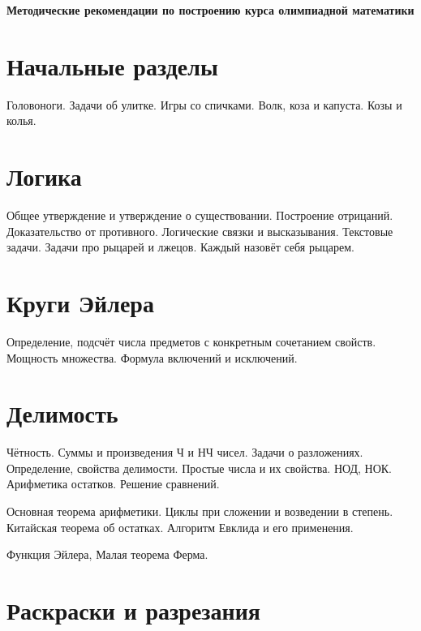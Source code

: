 \documentclass[a4paper,11pt,landscape]{article}
\begin{document}
 \thispagestyle{empty}

\begin{center}
    \Large \textbf{Методические рекомендации по построению курса олимпиадной математики}
\end{center}\vspace{-2mm}


\begin{paracol}{2}

\setlength{\columnsep}{0.9cm}

\section{Начальные разделы}

Головоноги. Задачи об улитке. Игры со спичками. Волк, коза и капуста. Козы и колья.

\section{Логика}

Общее утверждение и утверждение о существовании. Построение отрицаний. Доказательство от противного. Логические связки и высказывания. Текстовые задачи. Задачи про рыцарей и лжецов. Каждый назовёт себя рыцарем.

\section{Круги Эйлера}

Определение, подсчёт числа предметов с конкретным сочетанием свойств. Мощность множества. Формула включений и исключений.

\section{Делимость}

Чётность. Суммы и произведения Ч и НЧ чисел. Задачи о разложениях. Определение, свойства делимости. Простые числа и их свойства. НОД, НОК. Арифметика остатков. Решение сравнений.

Основная теорема арифметики. Циклы при сложении и возведении в степень. Китайская теорема об остатках. Алгоритм Евклида и его применения. 

Функция Эйлера, Малая теорема Ферма.

\section{Раскраски и разрезания}


\end{paracol}
\end{document}
